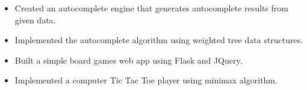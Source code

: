 \divider


\vspace{5pt}

\begin{itemize}
	\item Created an autocomplete engine that generates autocomplete results from given data.
	\item Implemented the autocomplete algorithm using weighted tree data structures.
\end{itemize}

\divider


\vspace{5pt}

\begin{itemize}
	\item Built a simple board games web app using Flask and JQuery.
	\item Implemented a computer Tic Tac Toe player using minimax algorithm.
\end{itemize}

